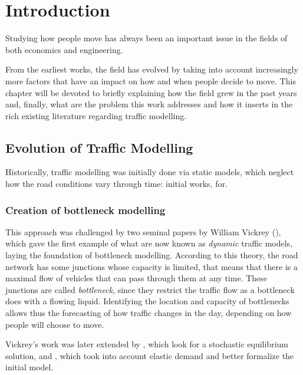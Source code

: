 
\chapter{Introduction}
\label{cha:introduction}

Studying how people move has always been an important issue in the fields of both economics  and  engineering.

From the earliest works, the field has evolved by taking into account increasingly more factors that have an impact on how and when people decide to move.
This chapter will be devoted to briefly explaining how the field grew in the past years and,
finally, what are the problem this work addresses and how it inserts in the rich existing literature regarding traffic modelling.

\section{Evolution of Traffic Modelling}
\label{sec:hist}

Historically, traffic modelling was initially done via static models,
which neglect how the road conditions vary through time:
initial works, for.

\subsection{Creation of bottleneck modelling}

This approach was challenged by two seminal papers by William Vickrey (\cite{f32d6720-dd02-34b7-a4ba-c4c21193efe7, 4ffb5da1-1f49-3898-98a7-209781744dc0}),
which gave the first example of what are now known as \textit{dynamic} traffic models,
laying the foundation of bottleneck modelling.
According to this theory, the road network has some junctions whose capacity is limited,
that means that there is a maximal flow of vehicles that can pass through them at any time.
These junctions are called \textit{bottleneck}, since they restrict the traffic flow as a bottleneck does with a flowing liquid.
Identifying the location and capacity of bottlenecks allows thus the forecasting of how traffic changes in the day,
depending on how people will choose to move.

Vickrey's work was later extended by \textcite{de1983stochastic}, which look for a stochastic equilibrium solution, and \textcite{d0907f84-e14a-3d98-ad20-759f41491d6e}, which took into account elastic demand and better formalize the initial model.

